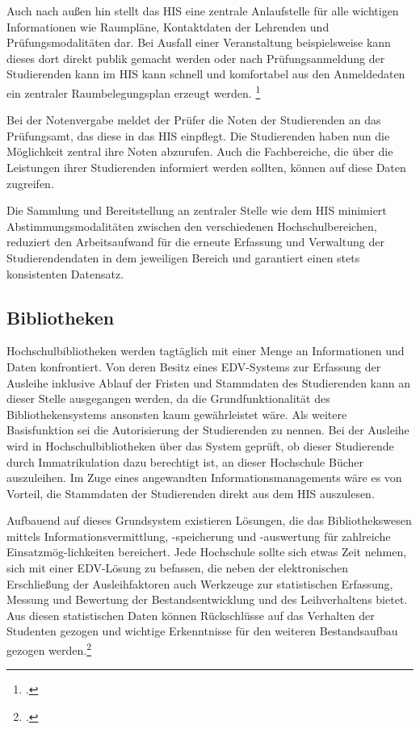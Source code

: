 Auch nach außen hin stellt das HIS eine zentrale Anlaufstelle für alle wichtigen 
Informationen wie Raumpläne, Kontaktdaten der Lehrenden und Prüfungsmodalitäten dar. Bei 
Ausfall einer Veranstaltung beispielsweise kann dieses dort direkt publik gemacht werden oder nach Prüfungsanmeldung der Studierenden kann im HIS kann schnell und komfortabel aus den Anmeldedaten ein zentraler Raumbelegungsplan erzeugt werden.
\footcite{evalag_eckpunkte_2012}

Bei der Notenvergabe meldet der Prüfer die Noten der Studierenden an das Prüfungsamt, das 
diese in das HIS einpflegt. Die Studierenden haben nun die Möglichkeit zentral ihre Noten 
abzurufen. Auch die Fachbereiche, die über die Leistungen ihrer Studierenden informiert 
werden sollten, können auf diese Daten zugreifen.

Die Sammlung und Bereitstellung an zentraler Stelle wie dem HIS minimiert 
Abstimmungsmodalitäten zwischen den verschiedenen Hochschulbereichen, reduziert den 
Arbeitsaufwand für die erneute Erfassung und Verwaltung der Studierendendaten in dem 
jeweiligen Bereich und garantiert einen stets konsistenten Datensatz.


\subsection{Bibliotheken}
Hochschulbibliotheken werden tagtäglich mit einer Menge an Informationen und Daten 
konfrontiert. Von deren Besitz eines EDV-Systems zur Erfassung der Ausleihe inklusive Ablauf 
der Fristen und Stammdaten des Studierenden kann an dieser Stelle ausgegangen werden, da 
die Grundfunktionalität des Bibliothekensystems ansonsten kaum gewährleistet wäre. Als 
weitere Basisfunktion sei die Autorisierung der Studierenden zu nennen. Bei der Ausleihe 
wird in Hochschulbibliotheken über das System geprüft, ob dieser Studierende durch 
Immatrikulation dazu berechtigt ist, an dieser Hochschule Bücher auszuleihen. 
Im Zuge eines angewandten Informationsmanagements wäre es von Vorteil, die Stammdaten der Studierenden direkt aus dem HIS auszulesen. 

Aufbauend auf dieses Grundsystem existieren Lösungen, die das Bibliothekswesen mittels 
Informationsvermittlung, -speicherung und -auswertung für zahlreiche 
Einsatzmög-lichkeiten bereichert. Jede Hochschule sollte sich etwas Zeit nehmen, sich mit 
einer EDV-Lösung zu befassen, die neben der elektronischen Erschließung der 
Ausleihfaktoren auch Werkzeuge zur statistischen Erfassung, Messung und Bewertung der 
Bestandsentwicklung und des Leihverhaltens bietet. Aus diesen statistischen Daten können 
Rückschlüsse auf das Verhalten der Studenten gezogen und wichtige Erkenntnisse für den 
weiteren Bestandsaufbau gezogen werden.\footcite[9 ff.]{merkle_aufbau_2004}

